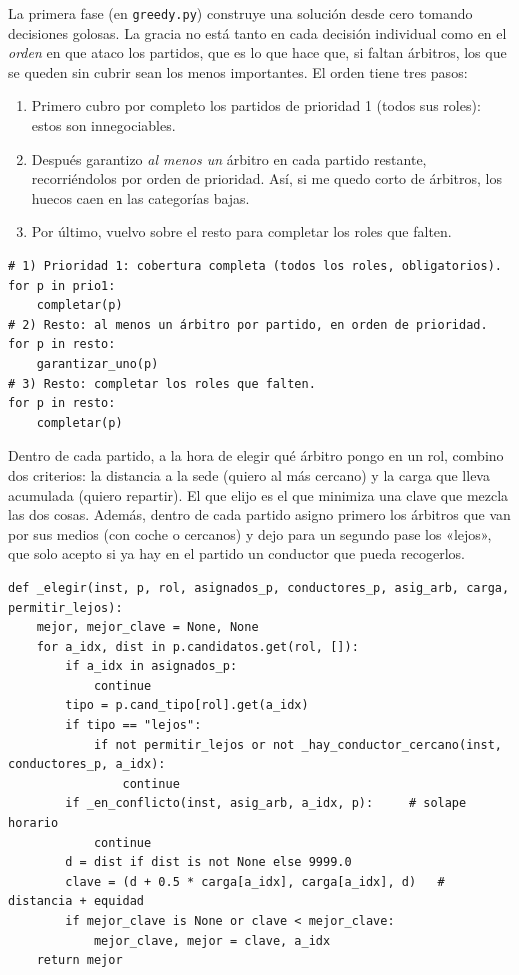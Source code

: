\documentclass[11pt,a4paper,spanish]{book}
\numberwithin{equation}{chapter}
\numberwithin{figure}{chapter}
\numberwithin{table}{chapter}
\begin{document}
La primera fase (en \texttt{greedy.py}) construye una solución desde cero tomando decisiones golosas. La gracia no está tanto en cada decisión individual como en el \emph{orden} en que ataco los partidos, que es lo que hace que, si faltan árbitros, los que se queden sin cubrir sean los menos importantes. El orden tiene tres pasos:

\begin{enumerate}
\item Primero cubro por completo los partidos de prioridad 1 (todos sus roles): estos son innegociables.
\item Después garantizo \emph{al menos un} árbitro en cada partido restante, recorriéndolos por orden de prioridad. Así, si me quedo corto de árbitros, los huecos caen en las categorías bajas.
\item Por último, vuelvo sobre el resto para completar los roles que falten.
\end{enumerate}

\begin{lstlisting}[caption={Orden de asignación de la fase golosa según la prioridad de la categoría (\texttt{greedy.py}).},label={lst:greedy-orden}]
# 1) Prioridad 1: cobertura completa (todos los roles, obligatorios).
for p in prio1:
    completar(p)
# 2) Resto: al menos un árbitro por partido, en orden de prioridad.
for p in resto:
    garantizar_uno(p)
# 3) Resto: completar los roles que falten.
for p in resto:
    completar(p)
\end{lstlisting}

Dentro de cada partido, a la hora de elegir qué árbitro pongo en un rol, combino dos criterios: la distancia a la sede (quiero al más cercano) y la carga que lleva acumulada (quiero repartir). El que elijo es el que minimiza una clave que mezcla las dos cosas. Además, dentro de cada partido asigno primero los árbitros que van por sus medios (con coche o cercanos) y dejo para un segundo pase los «lejos», que solo acepto si ya hay en el partido un conductor que pueda recogerlos.

\begin{lstlisting}[caption={Elección del mejor candidato para un rol: distancia más un término de equidad (\texttt{greedy.py}).},label={lst:greedy-elegir}]
def _elegir(inst, p, rol, asignados_p, conductores_p, asig_arb, carga, permitir_lejos):
    mejor, mejor_clave = None, None
    for a_idx, dist in p.candidatos.get(rol, []):
        if a_idx in asignados_p:
            continue
        tipo = p.cand_tipo[rol].get(a_idx)
        if tipo == "lejos":
            if not permitir_lejos or not _hay_conductor_cercano(inst, conductores_p, a_idx):
                continue
        if _en_conflicto(inst, asig_arb, a_idx, p):     # solape horario
            continue
        d = dist if dist is not None else 9999.0
        clave = (d + 0.5 * carga[a_idx], carga[a_idx], d)   # distancia + equidad
        if mejor_clave is None or clave < mejor_clave:
            mejor_clave, mejor = clave, a_idx
    return mejor
\end{lstlisting}
\end{document}
